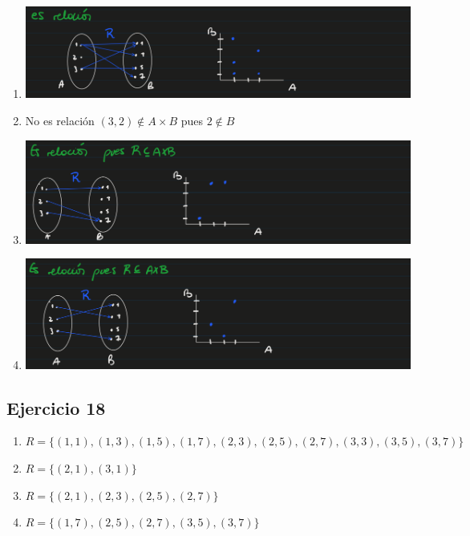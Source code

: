\begin{enumerate}[label=(\alph*)]
    \item \includegraphics[width=500px]{1.17.1}
    \item No es relación $(3,2) \not \in A\times B$ pues $2 \not \in B$
    \item \includegraphics[width=500px]{1.17.3}
    \item \includegraphics[width=500px]{1.17.4}
\end{enumerate}

\subsection{Ejercicio 18}
\begin{enumerate}[label=(\alph*)]
    \item $R = \{ (1,1), (1,3), (1,5), (1,7), (2,3), (2,5), (2,7), (3,3), (3,5), (3,7) \}$
    \item $R = \{ (2,1), (3,1) \}$
    \item $R = \{ (2,1), (2,3), (2,5), (2,7) \}$
    \item $R = \{ (1,7), (2,5), (2,7), (3,5), (3,7) \}$
\end{enumerate}

